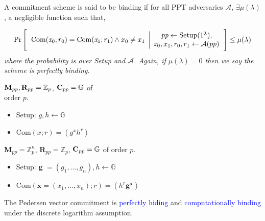 \begin{defn}
    A commitment scheme is said to be binding if for all PPT adversaries $\mathcal{A}$, $\exists \mu(\lambda)$, a negligible function such that,
\end{defn}
\begin{equation*}
        \Pr 
        \Bigg[
        \begin{tabular}{c | c}
             \multirow{2}{*}{$\text{Com}(\textit{x}_0;r_0)= \text{Com}(\textit{x}_1;r_1) \wedge x_0 \neq x_1$} 
             &
             $\textit{pp} \leftarrow \text{Setup}(1^{\lambda})$,\\
             &
             $\textit{x}_0, x_1, r_0, r_1 \leftarrow \mathcal{A}(pp)$
        \end{tabular}
        \Bigg] 
        \leq \mu(\lambda)
\end{equation*}
\textit{where the probability is over Setup and $\mathcal{A}$. Again, if $\mu(\lambda)=0$ then we say the scheme is perfectly binding.}

\begin{defn}
    ${\normalfont \textbf{M}}_{pp}, {\normalfont \textbf{R}}_{pp} = \mathbb{Z}_p$, ${\normalfont \textbf{C}}_{pp} = \mathbb{G}$ of \\order $p$.
    \begin{itemize}
        \item {\normalfont Setup}: $g, h \leftarrow \mathbb{G}$
        \item {\normalfont Com}$(x; r) = (g^x h^r)$
    \end{itemize}
\end{defn}

\begin{defn}
    {\normalfont \textbf{M}}$_{pp} = \mathbb{Z}_p^n$, {\normalfont \textbf{R}}$_{pp} = \mathbb{Z}_p$, ${\normalfont \textbf{C}}_{pp} = \mathbb{G}$ of order $p$.
    \begin{itemize}
        \item {\normalfont Setup}: \textbf{g} $= (g_1, \dots, g_n), h \leftarrow \mathbb{G}$
        \item {\normalfont Com}$(\textbf{x} = (x_1, \dots, x_n); r) = (h^r \textbf{g}^{\textbf{x}})$
    \end{itemize}
\end{defn}

The Pedersen vector commitment is \textcolor{blue}{perfectly hiding} and \textcolor{blue}{computationally binding} under the
discrete logarithm assumption.

